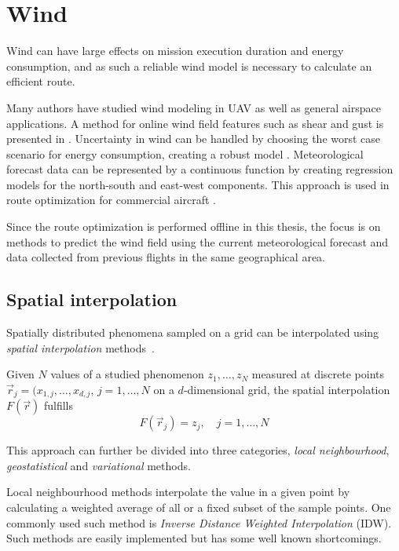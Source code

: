\section{Wind}\label{sec:wind}
Wind can have large effects on mission execution duration and energy consumption, and as such a reliable wind model is necessary to calculate an efficient route.

Many authors have studied wind modeling in UAV as well as general airspace applications. A method for online wind field features such as shear and gust is presented in \cite{wind_estimation}. Uncertainty in wind can be handled by choosing the worst case scenario for energy consumption, creating a robust model \cite{wind_blackbox}. Meteorological forecast data can be represented by a continuous function by creating regression models for the north-south and east-west components. This approach is used in route optimization for commercial aircraft \cite{aircraft_trajectory_thesis}.

Since the route optimization is performed offline in this thesis, the focus is on methods to predict the wind field using the current meteorological forecast and data collected from previous flights in the same geographical area.

\subsection{Spatial interpolation}
Spatially distributed phenomena sampled on a grid can be interpolated using \textit{spatial interpolation} methods~\cite{spatial_interpolation}.

\begin{definition}
    Given $N$ values of a studied phenomenon $z_1,\ldots,z_N$ measured at discrete points $\vec{r}_j=(x_{1,j}, \ldots, x_{d,j}$, $j=1,\ldots,N$ on a $d$-dimensional grid, the spatial interpolation $F(\vec{r})$ fulfills
    \begin{equation}
        F(\vec{r}_j)=z_j,\quad j=1,\ldots,N
    \end{equation}
\end{definition}

This approach can further be divided into three categories, \textit{local neighbourhood}, \textit{geostatistical} and \textit{variational} methods.

Local neighbourhood methods interpolate the value in a given point by calculating a weighted average of all or a fixed subset of the sample points. One commonly used such method is \textit{Inverse Distance Weighted Interpolation} (IDW). Such methods are easily implemented but has some well known shortcomings.

